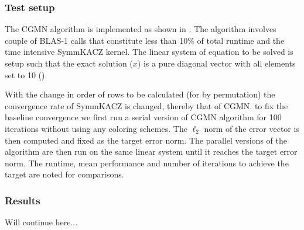\subsubsection{Test setup}
The CGMN algorithm is implemented as shown in \cite{CGMN_gordon}. The algorithm involves couple of BLAS-1 calls that constitute less than 10\% of total runtime and the time intensive \acrshort{SymmKACZ} kernel. The linear system of equation to be solved is setup such that the exact solution ($x$) is a pure diagonal vector with all elements set to 10 (\ie [10,10,10,...]).

With the change in order of rows to be calculated (for \eg by permutation) the convergence rate of \acrshort{SymmKACZ} is changed, thereby that of CGMN. \Inorder to fix the baseline convergence we first run a serial version of CGMN algorithm for 100 iterations without using any coloring schemes. The $\ell_2$ norm of the error vector is then computed and fixed as the target error  norm. The parallel versions of the algorithm are then run on the same linear system until it reaches the target error norm. The runtime, mean performance and number of iterations to achieve the target are noted for comparisons.


\subsubsection{Results}

{\GW Will continue here...}


